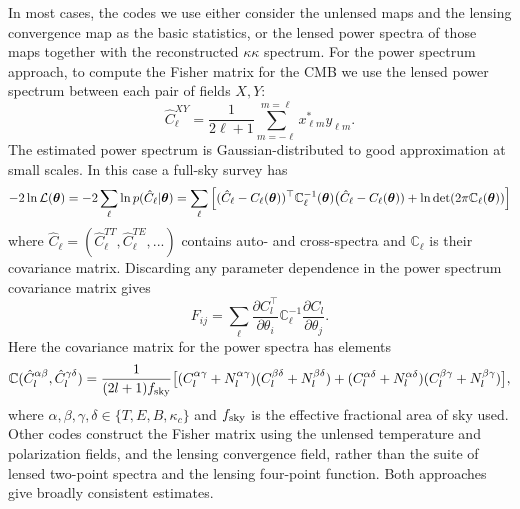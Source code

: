 In most cases, the codes we use either consider the unlensed maps and the lensing convergence map as the basic statistics, or the lensed power spectra of those maps together with the reconstructed $\kappa \kappa$ spectrum. For the power spectrum approach, to compute the Fisher matrix for the CMB we use the lensed power spectrum between each pair of fields $X, Y$:
%
\begin{equation}
\label{eqEstimator}
\hat{C}^{XY}_\ell = \frac{1}{2\ell+1}\sum_{m=-\ell}^{m=\ell} x^{*}_{\ell m} y_{\ell m}.
\end{equation}
%
The estimated power spectrum is Gaussian-distributed to good approximation at small scales. In this case a full-sky survey has
%
\begin{equation}
-2\ln\mathcal{L}(\boldsymbol{\theta}) = -2\sum_\ell \ln p( \hat{C}_\ell | \boldsymbol{\theta}) \\
=  \sum_\ell  \Big[ (\hat{C}_\ell - C_\ell(\boldsymbol{\theta}) )^\top  \mathbb{C}^{-1}_\ell(\boldsymbol{\theta}) \big(\hat{C}_\ell - C_\ell(\boldsymbol{\theta})) + \ln \det(2 \pi \mathbb{C}_\ell(\boldsymbol{\theta})) \Big]
\end{equation}
%
where $ \hat{C}_\ell = (\hat{C}_\ell^{TT}, \hat{C}_\ell^{TE}, ...) $ contains auto- and cross-spectra and $\mathbb{C}_\ell$ is their covariance matrix. Discarding any parameter dependence in the power spectrum covariance matrix gives
%
\begin{equation}
F_{ij} = \sum_\ell \frac{\partial C^\top_l}{\partial \theta_i} \mathbb{C}^{-1}_\ell \frac{\partial C_l}{\partial \theta_j}.
\end{equation}
%
Here the covariance matrix for the power spectra has elements
%
\begin{equation}
\mathbb{C}(\hat{C}_l^{\alpha \beta}, \hat{C}_l^{\gamma \delta}) = \frac{1}{(2l+1)f_{\rm sky}} \big[ (C_l^{\alpha \gamma} + N_l^{\alpha \gamma}) (C_l^{\beta \delta} + N_l^{\beta \delta})  \\
+ (C_l^{\alpha \delta} + N_l^{\alpha \delta}) (C_l^{\beta \gamma} + N_l^{\beta \gamma}) \big],
\end{equation}
%
where $\alpha, \beta, \gamma, \delta \in \{T, E, B, \kappa_c\}$ and $f_{\rm sky}$ is the effective fractional area of sky used.  Other codes construct the Fisher matrix using the unlensed temperature and polarization fields, and the lensing convergence field, rather than the suite of lensed two-point spectra and the lensing four-point function. Both approaches give broadly consistent estimates.  

